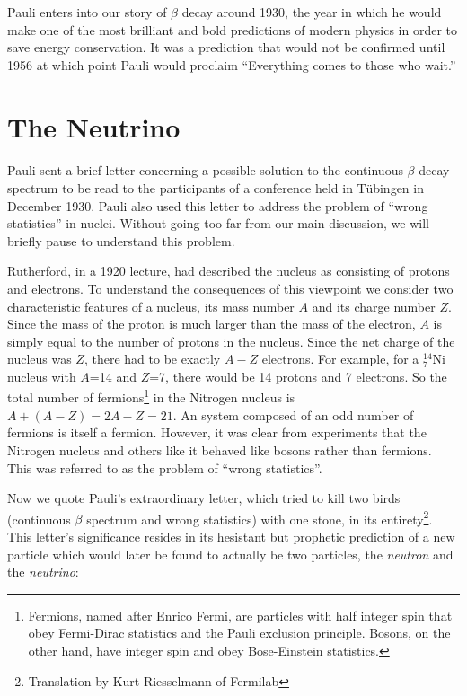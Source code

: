 \documentclass[12pt]{book}
\begin{document}
Pauli enters into our story of $\beta$ decay around 1930, the year in which he would make one of the most brilliant and bold predictions of modern physics in order to save energy conservation. It was a prediction that would not be confirmed until 1956\cite{cowan} at which point Pauli would proclaim ``Everything comes to those who wait.''

\section{The Neutrino}

\paragraph*{}Pauli sent a brief letter concerning a possible solution to the continuous $\beta$ decay spectrum to be read to the participants of a conference held in T\"{u}bingen in December 1930. Pauli also used this letter to address the problem of ``wrong statistics'' in nuclei. Without going too far from our main discussion, we will briefly pause to understand this problem. 

Rutherford, in a 1920 lecture\cite{rutherford}, had described the nucleus as consisting of protons and electrons. To understand the consequences of this viewpoint we consider two characteristic features of a nucleus, its mass number $A$ and its charge number $Z$. Since the mass of the proton is much larger than the mass of the electron, $A$ is simply equal to the number of protons in the nucleus. Since the net charge of the nucleus was $Z$, there had to be exactly $A-Z$ electrons. For example, for a $^{14}_{7}$Ni nucleus with $A$=14 and $Z$=7, there would be 14 protons and 7 electrons. So the total number of fermions\footnote{Fermions, named after Enrico Fermi, are particles with half integer spin that obey Fermi-Dirac statistics and the Pauli exclusion principle. Bosons, on the other hand, have integer spin and obey Bose-Einstein statistics.} in the Nitrogen nucleus is $A+(A-Z)=2A-Z=21$. An system composed of an odd number of fermions is itself a fermion. However, it was clear from experiments that the Nitrogen nucleus and others like it behaved like bosons rather than fermions. This was referred to as the problem of ``wrong statistics''\cite{brandt}.

Now we quote Pauli's extraordinary letter, which tried to kill two birds (continuous $\beta$ spectrum and wrong statistics) with one stone, in its entirety\footnote{Translation by Kurt Riesselmann of Fermilab}. This letter's significance resides in its hesistant but prophetic prediction of a new particle which would later be found to actually be two particles, the \textit{neutron} and the \textit{neutrino}:
\end{document}
